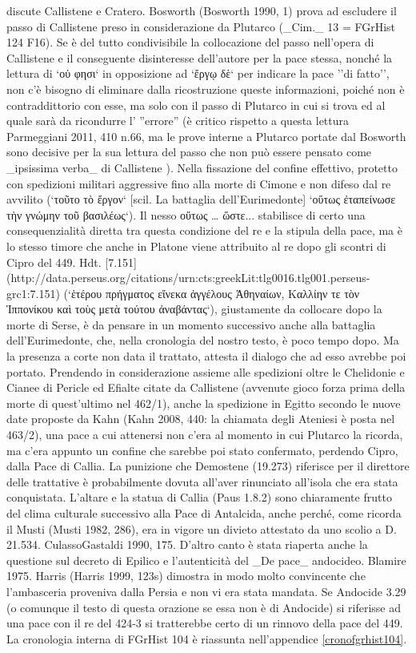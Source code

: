 {%
discute  Callistene  e Cratero. Bosworth (Bosworth 1990, 1) prova ad escludere il passo di  Callistene  preso in considerazione da Plutarco (_Cim._ 13 = FGrHist 124 F16). Se è del tutto condivisibile la collocazione del passo nell'opera di  Callistene  e il conseguente disinteresse dell'autore per la pace stessa, nonché la lettura di `οὑ φησι` in opposizione ad `ἔργῳ δὲ` per indicare la pace ''di fatto'', non c'è bisogno di eliminare dalla ricostruzione queste informazioni, poiché non è contraddittorio con esse, ma solo con il passo di Plutarco in cui si trova ed al quale sarà da ricondurre l' ''errore'' (è critico rispetto a questa lettura Parmeggiani 2011, 410 n.66, ma le prove interne a Plutarco portate dal Bosworth sono decisive per la sua lettura del passo che non può essere pensato come _ipsissima verba_ di  Callistene ). Nella fissazione del confine effettivo, protetto con spedizioni militari aggressive fino alla morte di  Cimone e non difeso dal re avvilito (`τοῦτο τὸ ἔργον` [scil. La battaglia dell'Eurimedonte] `οὕτως ἐταπείνωσε τὴν γνώμην τοῦ βασιλέως`). Il nesso \textgreek{οὕτως … ὥστε...} stabilisce di certo una consequenzialità diretta tra questa condizione del re e la stipula della pace, ma è lo stesso timore che anche in Platone viene attribuito al re dopo gli scontri di Cipro del 449. Hdt. [7.151](http://data.perseus.org/citations/urn:cts:greekLit:tlg0016.tlg001.perseus-grc1:7.151) (`ἑτέρου πρήγματος εἵνεκα ἀγγέλους Ἀθηναίων, Καλλίην τε τὸν Ἱππονίκου καὶ τοὺς μετὰ τούτου ἀναβάντας`), giustamente da collocare dopo la morte di Serse, è da pensare in un momento successivo anche alla battaglia dell'Eurimedonte, che, nella cronologia del nostro testo, è poco tempo dopo. Ma la presenza a corte non data il trattato, attesta il dialogo che ad esso avrebbe poi portato. Prendendo in considerazione assieme alle spedizioni oltre le Chelidonie e Cianee di Pericle  ed Efialte citate da  Callistene  (avvenute gioco forza prima della morte di quest'ultimo nel 462/1), anche la spedizione in Egitto secondo le nuove date proposte da Kahn (Kahn 2008, 440: la chiamata degli Ateniesi è posta nel 463/2), una pace a cui attenersi non c'era al momento in cui Plutarco la ricorda, ma c'era appunto un confine che sarebbe poi stato confermato, perdendo Cipro, dalla Pace di Callia. La punizione che Demostene (19.273) riferisce per il direttore delle trattative è probabilmente dovuta all'aver rinunciato all'isola che era stata conquistata. L'altare e la statua di Callia (Paus 1.8.2) sono chiaramente frutto del clima culturale successivo alla Pace di Antalcida, anche perché, come ricorda il Musti (Musti 1982, 286), era in vigore un divieto attestato da uno scolio a D. 21.534. CulassoGastaldi 1990, 175. D'altro canto è stata riaperta anche la questione sul decreto di Epilico e l'autenticità del _De pace_ andocideo. Blamire 1975. Harris (Harris 1999, 123s) dimostra in modo molto convincente che l'ambasceria proveniva dalla Persia e non vi era stata mandata. Se Andocide 3.29 (o comunque il testo di questa orazione se essa non è di Andocide) si riferisse ad una pace con il re del 424-3 si tratterebbe certo di un rinnovo della pace del 449. La cronologia interna di FGrHist 104 è riassunta nell'appendice \ref{cronofgrhist104}. 
}
